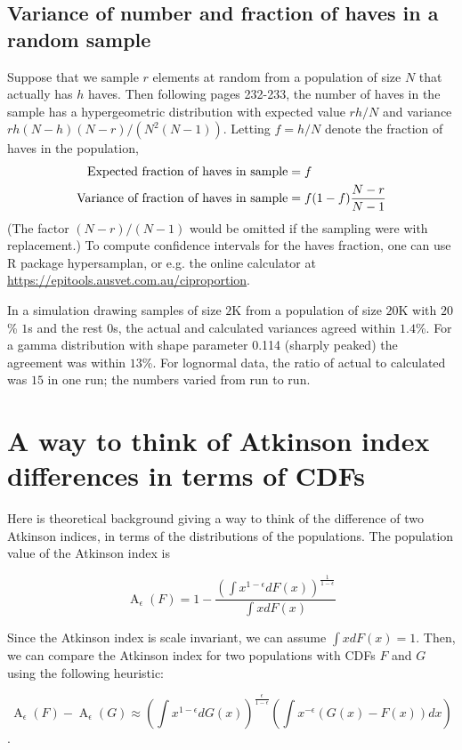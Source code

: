 \documentclass[11pt, oneside]{article}  %
\DeclareMathOperator{\Atkinson}{A}
\begin{document}
\subsection{Variance of number and fraction of haves in a random sample}
Suppose that we sample $r$ elements at random from a population of size $N$ that actually has $h$ haves. Then following \cite{Feller} pages 232-233, the number of haves in the sample has a hypergeometric distribution with expected value $r h / N$ and variance $r h (N - h) (N - r) / (N^2 (N - 1))$.  Letting $f = h / N$ denote the fraction of haves in the population,
\begin{align}
  \text{Expected fraction of haves in sample} &= f \notag \\
  \text{Variance of fraction of haves in sample} &= f (1 - f) \frac{N - r}{N - 1} \notag
\end{align}
(The factor $(N - r) / (N - 1)$ would be omitted if the sampling were with replacement.)  To compute confidence intervals for the haves fraction, one can use R package hypersamplan, or e.g. the online calculator at \url{https://epitools.ausvet.com.au/ciproportion}.

In a simulation drawing samples of size $2$K from a population of size $20$K with $20$\% $1$s and the rest $0$s, the actual and calculated variances agreed within $1.4$\%.  For a gamma distribution with shape parameter 0.114 (sharply peaked) the agreement was within $13$\%.  For lognormal data, the ratio of actual to calculated was $15$ in one run; the numbers varied from run to run.

\section{A way to think  of  Atkinson index differences in terms of CDFs}

Here is theoretical background giving a way to think of the difference of two Atkinson indices, in terms of the distributions of the populations.  The population value of the Atkinson index is

\[ \Atkinson_\epsilon(F) = 1 - \frac{\left(\int x^{1-\epsilon} dF(x) \right)^{\frac{1}{1-\epsilon}}}{\int x dF(x)} \]

Since the Atkinson index is scale invariant, we can assume \(\int x dF(x) = 1\). Then, we can compare the Atkinson index for two populations with CDFs \(F\) and \(G\) using the following heuristic:

\[\Atkinson_\epsilon(F)  - \Atkinson_\epsilon(G)  \approx \left(\int x^{1-\epsilon} dG(x) \right)^{\frac{\epsilon}{1-\epsilon}}  \left(\int x^{-\epsilon} (G(x)- F(x)) d x \right)\].
\end{document}
